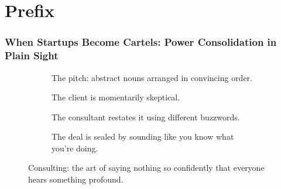 \part{Prefix}

\section{When Startups Become Cartels: Power Consolidation in Plain Sight}

\vfill

\begin{figure}[H]
  \centering
  
  \begin{subfigure}[t]{0.45\textwidth}
  \centering
  \caption*{The pitch: abstract nouns arranged in convincing order.}
  \end{subfigure}
  \hfill
  \begin{subfigure}[t]{0.45\textwidth}
  \centering
  \caption*{The client is momentarily skeptical.}
  \end{subfigure}
  
  \vspace{1em}
  
  \begin{subfigure}[t]{0.45\textwidth}
  \centering
  \caption*{The consultant restates it using different buzzwords.}
  \end{subfigure}
  \hfill
  \begin{subfigure}[t]{0.45\textwidth}
  \centering
  \caption*{The deal is sealed by sounding like you know what you’re doing.}
  \end{subfigure}
  
  \caption*{Consulting: the art of saying nothing so confidently that everyone hears something profound.}
  \end{figure}




